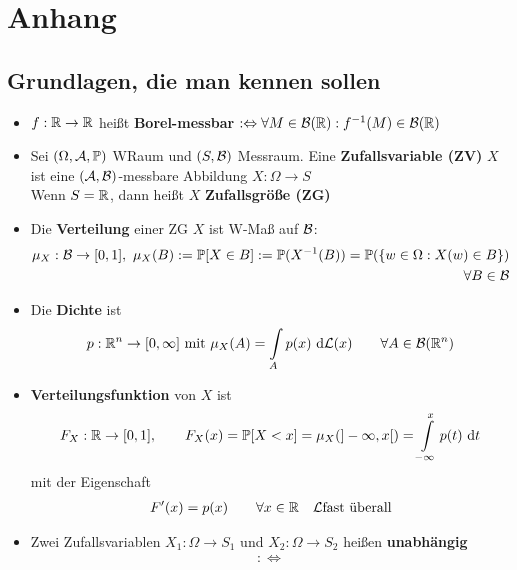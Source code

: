 
\setcounter{chapter}{0}
\renewcommand{\thechapter}{\Alph{chapter}}
\chapter{Anhang}
\setcounter{equation}{1}
\section{Grundlagen, die man kennen sollen}
\begin{itemize}
\item $f:\mathbb{R}\to\mathbb{R}$ heißt \textbf{Borel-messbar} $:\Leftrightarrow\forall M\in\mathcal{B}(\mathbb{R}):f^{-1}(M)\in\mathcal{B}(\mathbb{R})$
\item Sei $(\Omega,\mathcal{A}, \mathbb{P})$ WRaum und $(S,\mathcal{B})$ Messraum. Eine \textbf{Zufallsvariable (ZV)} $X$ ist eine $(\mathcal{A},\mathcal{B})$-messbare Abbildung $X:\Omega\to S$\\
Wenn $S=\mathbb{R}$, dann heißt $X$ \textbf{Zufallsgröße (ZG)}
\item Die \textbf{Verteilung} einer ZG $X$ ist W-Maß auf $\mathcal{B}$:
\begin{align*}
\mu_X:\mathcal{B}\to[0,1],~
\mu_X(B):=\mathbb{P}[X\in B]:=\mathbb{P}(X^{-1}(B))=\mathbb{P}(\lbrace w\in\Omega:X(w)\in B\rbrace)\\\forall B\in\mathcal{B}
\end{align*}
\item Die \textbf{Dichte} ist
\begin{align*}
p:\mathbb{R}^n\to[0,\infty]\text{ mit } \mu_X(A)=\int\limits_A p(x)\text{ d}\mathcal{L}(x)\qquad\forall A\in\mathcal{B}(\mathbb{R}^n)
\end{align*}
\item \textbf{Verteilungsfunktion} von $X$ ist
\begin{align*}
F_X:\mathbb{R}\to[0,1],\qquad F_X(x)=\mathbb{P}[X<x]=\mu_X(]-\infty,x[)=\int\limits_{-\infty}^x p(t)\text{ d} t
\end{align*}
mit der Eigenschaft
\begin{align*}
F'(x)=p(x)\qquad\forall x\in\mathbb{R}~~~\mathcal{L}\text{fast überall}
\end{align*}
\item Zwei Zufallsvariablen $X_1:\Omega\to S_1$ und $X_2:\Omega\to S_2$ heißen \textbf{unabhängig} 
\begin{align*}
:\Longleftrightarrow

\end{align*}
\end{itemize}
